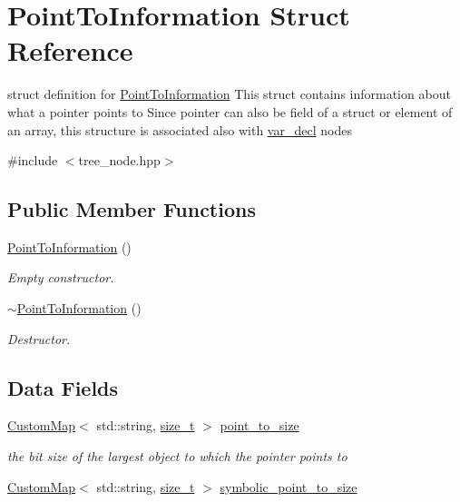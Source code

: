 \hypertarget{structPointToInformation}{}\section{Point\+To\+Information Struct Reference}
\label{structPointToInformation}


struct definition for \hyperlink{structPointToInformation}{Point\+To\+Information} This struct contains information about what a pointer points to Since pointer can also be field of a struct or element of an array, this structure is associated also with \hyperlink{structvar__decl}{var\+\_\+decl} nodes  




{\ttfamily \#include $<$tree\+\_\+node.\+hpp$>$}

\subsection*{Public Member Functions}
\begin{DoxyCompactItemize}
\item 
\hyperlink{structPointToInformation_a70dd4a9a913e62c85255283d6e523224}{Point\+To\+Information} ()
\begin{DoxyCompactList}\small\item\em Empty constructor. \end{DoxyCompactList}\item 
\hyperlink{structPointToInformation_a739fd1bd312a07834a8d47a91b1ef00e}{$\sim$\+Point\+To\+Information} ()
\begin{DoxyCompactList}\small\item\em Destructor. \end{DoxyCompactList}\end{DoxyCompactItemize}
\subsection*{Data Fields}
\begin{DoxyCompactItemize}
\item 
\hyperlink{custom__map_8hpp_a18ca01763abbe3e5623223bfe5aaac6b}{Custom\+Map}$<$ std\+::string, \hyperlink{tutorial__fpt__2017_2intro_2sixth_2test_8c_a7c94ea6f8948649f8d181ae55911eeaf}{size\+\_\+t} $>$ \hyperlink{structPointToInformation_a39949ca97d02f40be61a957b1ab3f864}{point\+\_\+to\+\_\+size}
\begin{DoxyCompactList}\small\item\em the bit size of the largest object to which the pointer points to \end{DoxyCompactList}\item 
\hyperlink{custom__map_8hpp_a18ca01763abbe3e5623223bfe5aaac6b}{Custom\+Map}$<$ std\+::string, \hyperlink{tutorial__fpt__2017_2intro_2sixth_2test_8c_a7c94ea6f8948649f8d181ae55911eeaf}{size\+\_\+t} $>$ \hyperlink{structPointToInformation_ad1ae56e5f06d9731849cb3664797de0b}{symbolic\+\_\+point\+\_\+to\+\_\+size}
\end{DoxyCompactItemize}

